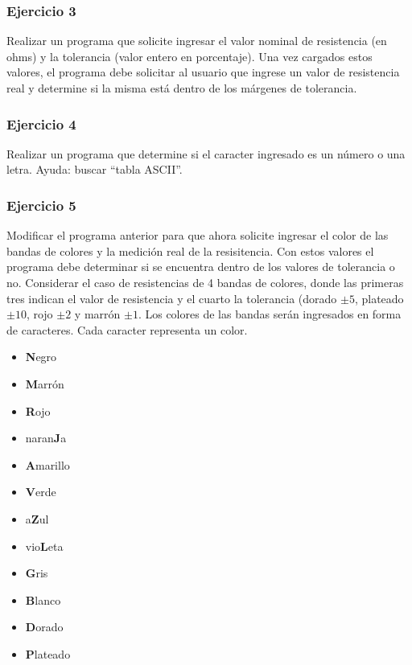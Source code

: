 \subsubsection{Ejercicio 3} 
Realizar un programa que solicite ingresar el valor nominal de resistencia (en ohms) y la tolerancia (valor entero en porcentaje). Una vez cargados estos valores, el programa debe solicitar al usuario que ingrese un valor de resistencia real y determine si la misma está dentro de los márgenes de tolerancia. 
{\small
  \lstset{inputencoding=utf8/latin1}
  
}

\subsubsection{Ejercicio 4} 
Realizar un programa que determine si el caracter ingresado es un número o una letra. Ayuda: buscar ``tabla ASCII''.
{\small
  \lstset{inputencoding=utf8/latin1}
  
}

\subsubsection{Ejercicio 5} 
Modificar el programa anterior para que ahora solicite ingresar el color de las bandas de colores y la medición real de la resisitencia. Con estos valores el programa debe determinar si se encuentra dentro de los valores de tolerancia o no. Considerar el caso de resistencias de 4 bandas de colores, donde las primeras tres indican el valor de resistencia y el cuarto la tolerancia (dorado $ \pm 5 $, plateado $\pm 10$, rojo $\pm 2$ y marrón $\pm 1$. Los colores de las bandas serán ingresados en forma de caracteres. Cada caracter representa un color.
\begin{itemize}
  \item \textbf{N}egro
  \item \textbf{M}arrón
  \item \textbf{R}ojo
  \item naran\textbf{J}a
  \item \textbf{A}marillo
  \item \textbf{V}erde
  \item a\textbf{Z}ul
  \item vio\textbf{L}eta
  \item \textbf{G}ris
  \item \textbf{B}lanco
  \item \textbf{D}orado
  \item \textbf{P}lateado
  \end{itemize}
{\small
  \lstset{inputencoding=utf8/latin1}
  
}

